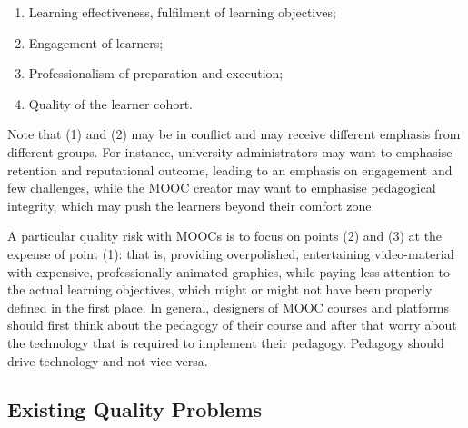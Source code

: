 \begin{enumerate}

\item Learning effectiveness, fulfilment of learning objectives;

\item Engagement of learners;

\item Professionalism of preparation and execution;

\item Quality of the learner cohort.

\end{enumerate}


Note that (1) and (2) may be in conflict and may receive different
emphasis from different groups. For instance, university administrators
may want to emphasise retention and reputational
outcome, leading to an emphasis on engagement and few challenges,
while the MOOC
creator may want to emphasise pedagogical integrity, which may push the
learners beyond their comfort zone.

A particular quality risk with MOOCs is to focus on points (2) and (3)
at the expense of point (1): that is, providing overpolished,
entertaining video-material with expensive, professionally-animated
graphics, while paying less attention to
the actual learning objectives, which might or might not have 
been properly defined in the first place. In general, designers of MOOC
courses and platforms should first think about the pedagogy of their
course and after that worry about the technology that is required to
implement their pedagogy. Pedagogy should drive technology and not vice
versa.


\subsection{Existing Quality Problems}

